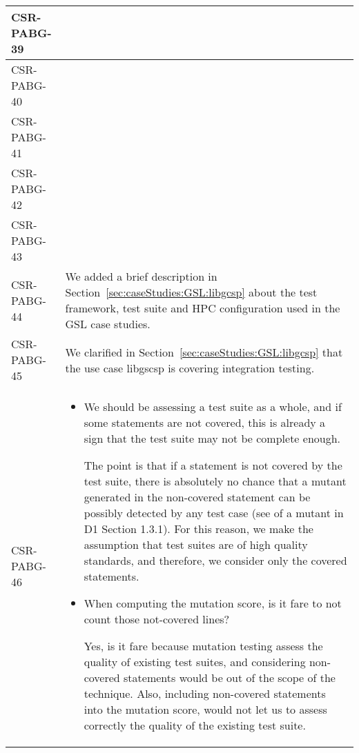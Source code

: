 \begin{longtable}{|p{1.5cm}|p{12cm}|@{}}
\hline
CSR-PABG-39&
\begin{minipage}{12cm}
\end{minipage}\\
\hline
CSR-PABG-40&
\begin{minipage}{12cm}
\end{minipage}\\
\hline
CSR-PABG-41&
\begin{minipage}{12cm}
\end{minipage}\\
\hline
CSR-PABG-42&
\begin{minipage}{12cm}
\end{minipage}\\
\hline
CSR-PABG-43&
\begin{minipage}{12cm}
\end{minipage}\\
\hline
CSR-PABG-44&
\begin{minipage}{12cm}
We added a brief description in Section~\ref{sec:caseStudies:GSL:libgcsp} about the test framework, test suite and HPC configuration used in the GSL case studies.
\end{minipage}\\
\hline
CSR-PABG-45&
\begin{minipage}{12cm}
We clarified in Section~\ref{sec:caseStudies:GSL:libgcsp} that the use case libgscsp is covering integration testing.
\end{minipage}\\
\hline
CSR-PABG-46&
\begin{minipage}{12cm}

\begin{itemize}
	\item We should be assessing a test suite as a whole, and if some statements are not covered, this is already a sign that the test suite may not be complete enough. 
	
	The point is that if a statement is not covered by the test suite, there is absolutely no chance that a mutant generated in the non-covered statement can be possibly detected by any test case (see \INDEX{killing conditions} of a mutant in D1 Section 1.3.1). For this reason, we make the assumption that test suites are of high quality standards, and therefore, we consider only the covered statements.

	\item When computing the mutation score, is it fare to not count those not-covered lines?

	Yes, is it fare because mutation testing assess the quality of existing test suites, and considering non-covered statements would be out of the scope of the technique. Also, including non-covered statements into the mutation score, would not let us to assess correctly the quality of the existing test suite.


\end{itemize}
\end{minipage}
\end{longtable}
